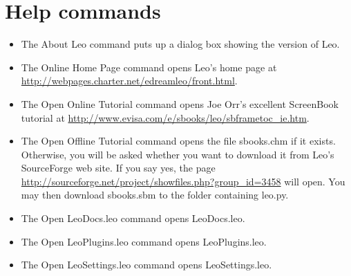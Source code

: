 \documentclass[a4paper,10pt,english]{sphinxmanual}
\begin{document}
\section{Help commands}
\label{commands:id2}\begin{itemize}
\item {} 
The About Leo command puts up a dialog box showing the version of Leo.

\item {} 
The Online Home Page command opens Leo's home page at \href{http://webpages.charter.net/edreamleo/front.html}{http://webpages.charter.net/edreamleo/front.html}.

\item {} 
The Open Online Tutorial command opens Joe Orr's excellent ScreenBook tutorial at
\href{http://www.evisa.com/e/sbooks/leo/sbframetoc\_ie.htm}{http://www.evisa.com/e/sbooks/leo/sbframetoc\_ie.htm}.

\item {} 
The Open Offline Tutorial command opens the file sbooks.chm if it exists.
Otherwise, you will be asked whether you want to download it from Leo's SourceForge web site.
If you say yes, the page \href{http://sourceforge.net/project/showfiles.php?group\_id=3458}{http://sourceforge.net/project/showfiles.php?group\_id=3458} will open.
You may then download sbooks.sbm to the folder containing leo.py.

\item {} 
The Open LeoDocs.leo command opens LeoDocs.leo.

\item {} 
The Open LeoPlugins.leo command opens LeoPlugins.leo.

\item {} 
The Open LeoSettings.leo command opens LeoSettings.leo.

\end{itemize}
\end{document}
